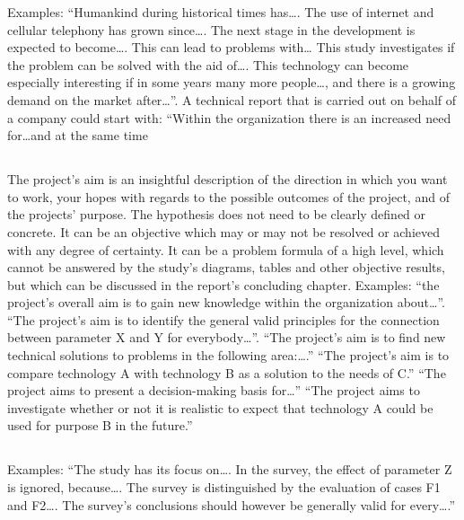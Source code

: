 Examples: ``Humankind during historical times has\dots. The use of internet and
cellular telephony has grown since\dots. The next stage in the development is
expected to become\dots. This can lead to problems with… This study investigates if
the problem can be solved with the aid of\dots. This technology can become
especially interesting if in some years many more people\dots, and there is a
growing demand on the market after\dots''.
A technical report that is carried out on behalf of a company could start with:
“Within the organization there is an increased need for\dots and at the same time

\subsection{}\label{subsec:aim}
\noindent
The project's aim is an insightful description of the direction in which you
want to work, your hopes with regards to the possible outcomes of the project,
and of the projects' purpose. The hypothesis does not need to be clearly defined
or concrete. It can be an objective which may or may not be resolved or achieved
with any degree of certainty. It can be a problem formula of a high level, which
cannot be answered by the study's diagrams, tables and other objective results,
but which can be discussed in the report's concluding chapter. Examples: ``the
project's overall aim is to gain new knowledge within the organization
about\dots''.
``The project's aim is to identify the general valid principles for the
connection between parameter X and Y for everybody\dots''. ``The project's aim is to
find new technical solutions to problems in the following area:\dots.'' ``The
project's aim is to compare technology A with technology B as a solution to the
needs of C.'' ``The project aims to present a decision-making basis for\dots''
``The project aims to investigate whether or not it is realistic to expect that
technology A could be used for purpose B in the future.''

\subsection{}\label{subsec:scope}
\noindent
Examples: ``The study has its focus on\dots. In the survey, the effect of parameter Z
is ignored, because…. The survey is distinguished by the evaluation of cases F1
and F2\dots. The survey's conclusions should however be generally valid for
every\dots.''

